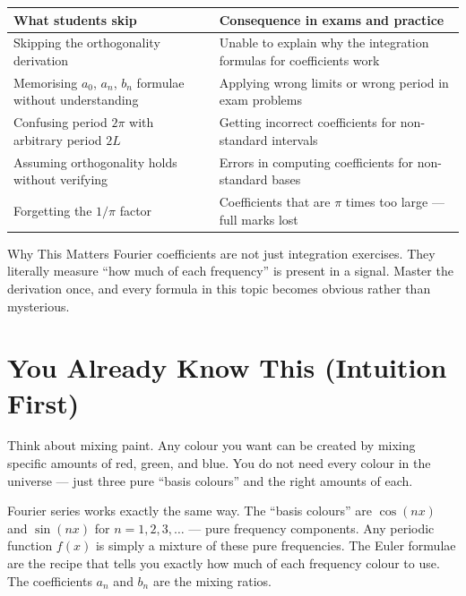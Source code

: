 \documentclass[12pt,a4paper]{article}
\begin{document}
\begin{center}
\begin{tabular}{p{6cm} p{7cm}}
\toprule
\textbf{What students skip} & \textbf{Consequence in exams and practice} \\
\midrule
Skipping the orthogonality derivation & Unable to explain why the integration formulas for coefficients work \\
\midrule
Memorising $a_0$, $a_n$, $b_n$ formulae without understanding & Applying wrong limits or wrong period in exam problems \\
\midrule
Confusing period $2\pi$ with arbitrary period $2L$ & Getting incorrect coefficients for non-standard intervals \\
\midrule
Assuming orthogonality holds without verifying & Errors in computing coefficients for non-standard bases \\
\midrule
Forgetting the $1/\pi$ factor & Coefficients that are $\pi$ times too large --- full marks lost \\
\bottomrule
\end{tabular}
\end{center}

\begin{learnbox}{Why This Matters}
Fourier coefficients are not just integration exercises. They literally measure ``how much of each frequency'' is present in a signal.
Master the derivation once, and every formula in this topic becomes obvious rather than mysterious.
\end{learnbox}

\section{You Already Know This (Intuition First)}

Think about mixing paint.
Any colour you want can be created by mixing specific amounts of red, green, and blue.
You do not need every colour in the universe --- just three pure ``basis colours'' and the right amounts of each.

Fourier series works exactly the same way.
The ``basis colours'' are $\cos(nx)$ and $\sin(nx)$ for $n = 1, 2, 3, \ldots$ --- pure frequency components.
Any periodic function $f(x)$ is simply a mixture of these pure frequencies.
The Euler formulae are the recipe that tells you exactly how much of each frequency colour to use.
The coefficients $a_n$ and $b_n$ are the mixing ratios.
\end{document}
